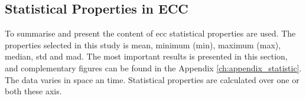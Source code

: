 \subsection{Statistical Properties in ECC}
To summarise and present the content of \acrshort{ecc} statistical properties are used. The properties selected in this study is mean, minimum (min), maximum (max), median, \acrfull{std} and \acrfull{mad}. The most important results is presented in this section, and complementary figures can be found in the Appendix \ref{ch:appendix_statistic}. 
The data varies in space an time. Statistical properties are calculated over one or both these axis. %

